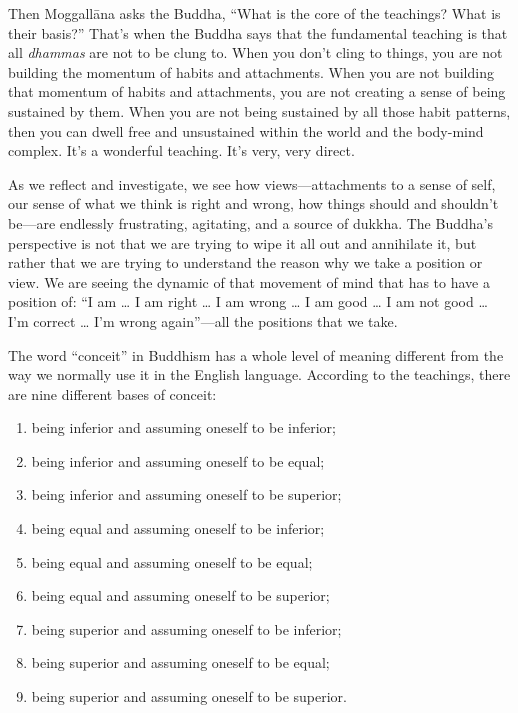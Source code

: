 Then Moggallāna asks the Buddha, “What is the core of the teachings?
What is their basis?” That’s when the Buddha says that the fundamental
teaching is that all \emph{dhammas} are not to be clung to. When you
don’t cling to things, you are not building the momentum of habits and
attachments. When you are not building that momentum of habits and
attachments, you are not creating a sense of being sustained by them.
When you are not being sustained by all those habit patterns, then you
can dwell free and unsustained within the world and the body-mind
complex. It’s a wonderful teaching. It’s very, very direct.

As we reflect and investigate, we see how views—attachments to a sense
of self, our sense of what we think is right and wrong, how things
should and shouldn’t be—are endlessly frustrating, agitating, and a
source of dukkha. The Buddha’s perspective is not that we are trying to
wipe it all out and annihilate it, but rather that we are trying to
understand the reason why we take a position or view. We are seeing the
dynamic of that movement of mind that has to have a position of: “I am
\ldots{} I am right \ldots{} I am wrong \ldots{} I am good \ldots{} I am not good \ldots{} I’m
correct \ldots{} I’m wrong again”—all the positions that we take.

The word “conceit” in Buddhism has a whole level of meaning different
from the way we normally use it in the English language. According to
the teachings, there are nine different bases of conceit:

\begin{enumerate}
\def\labelenumi{\arabic{enumi}.}
\item
  being inferior and assuming oneself to be inferior;
\item
  being inferior and assuming oneself to be equal;
\item
  being inferior and assuming oneself to be superior;
\item
  being equal and assuming oneself to be inferior;
\item
  being equal and assuming oneself to be equal;
\item
  being equal and assuming oneself to be superior;
\item
  being superior and assuming oneself to be inferior;
\item
  being superior and assuming oneself to be equal;
\item
  being superior and assuming oneself to be superior.
\end{enumerate}

